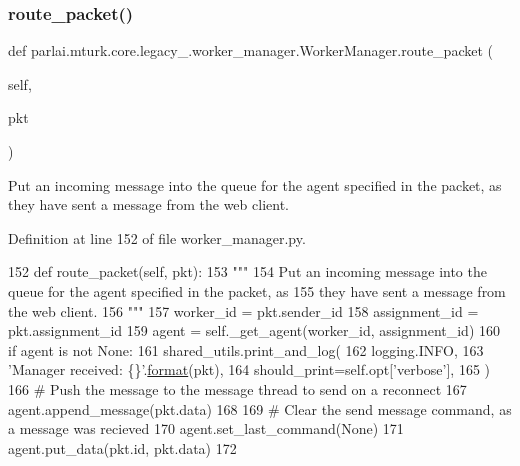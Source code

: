 \subsubsection{\texorpdfstring{route\+\_\+packet()}{route\_packet()}}
{\footnotesize\ttfamily def parlai.\+mturk.\+core.\+legacy\+\_.\+worker\+\_\+manager.\+Worker\+Manager.\+route\+\_\+packet (\begin{DoxyParamCaption}\item[{}]{self,  }\item[{}]{pkt }\end{DoxyParamCaption})}

\begin{DoxyVerb}Put an incoming message into the queue for the agent specified in the packet, as
they have sent a message from the web client.
\end{DoxyVerb}
 

Definition at line 152 of file worker\+\_\+manager.\+py.


\begin{DoxyCode}
152     \textcolor{keyword}{def }route\_packet(self, pkt):
153         \textcolor{stringliteral}{"""}
154 \textcolor{stringliteral}{        Put an incoming message into the queue for the agent specified in the packet, as}
155 \textcolor{stringliteral}{        they have sent a message from the web client.}
156 \textcolor{stringliteral}{        """}
157         worker\_id = pkt.sender\_id
158         assignment\_id = pkt.assignment\_id
159         agent = self.\_get\_agent(worker\_id, assignment\_id)
160         \textcolor{keywordflow}{if} agent \textcolor{keywordflow}{is} \textcolor{keywordflow}{not} \textcolor{keywordtype}{None}:
161             shared\_utils.print\_and\_log(
162                 logging.INFO,
163                 \textcolor{stringliteral}{'Manager received: \{\}'}.\hyperlink{namespaceparlai_1_1chat__service_1_1services_1_1messenger_1_1shared__utils_a32e2e2022b824fbaf80c747160b52a76}{format}(pkt),
164                 should\_print=self.opt[\textcolor{stringliteral}{'verbose'}],
165             )
166             \textcolor{comment}{# Push the message to the message thread to send on a reconnect}
167             agent.append\_message(pkt.data)
168 
169             \textcolor{comment}{# Clear the send message command, as a message was recieved}
170             agent.set\_last\_command(\textcolor{keywordtype}{None})
171             agent.put\_data(pkt.id, pkt.data)
172 
\end{DoxyCode}
\mbox{\label{classparlai_1_1mturk_1_1core_1_1legacy__2018_1_1worker__manager_1_1WorkerManager_ae37565b2ca25dfa147f7c535551d9b88}} 
